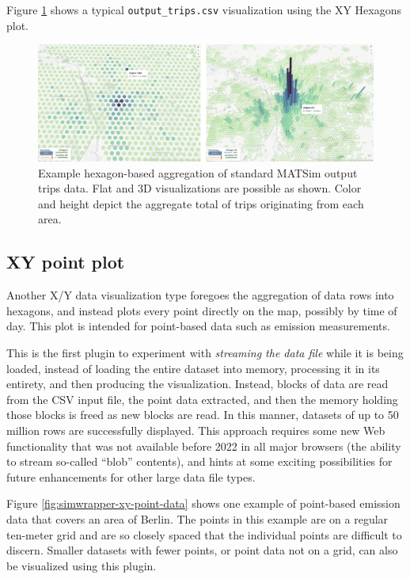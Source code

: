 Figure \ref{fig:simwrapper-xy-hexagons} shows a typical \texttt{output\_trips.csv} visualization using the XY Hexagons plot.

\begin{figure}[ht]
  \centering
  \includegraphics[width=0.95\linewidth]{chapters/31-simwrapper/images/xy-hexagons.jpg}
  \caption{Example hexagon-based aggregation of standard MATSim output trips data. Flat and 3D visualizations are possible as shown. Color and height depict the aggregate total of trips originating from each area. }
  \label{fig:simwrapper-xy-hexagons}
\end{figure}

\hypertarget{simwrapper-xyt-plots}{%
\subsection{XY point plot}\label{simwrapper-xy-point-plots}}

Another X/Y data visualization type foregoes the aggregation of data rows into hexagons, and instead plots every point directly on the map, possibly by time of day. This plot is intended for point-based data such as emission measurements.

This is the first plugin to experiment with \emph{streaming the data file} while it is being loaded, instead of loading the entire dataset into memory, processing it in its entirety, and then producing the visualization. Instead, blocks of data are read from the CSV input file, the point data extracted, and then the memory holding those blocks is freed as new blocks are read. In this manner, datasets of up to 50 million rows are successfully displayed. This approach requires some new Web functionality that was not available before 2022 in all major browsers (the ability to stream so-called ``blob'' contents), and hints at some exciting possibilities for future enhancements for other large data file types.

Figure \ref{fig:simwrapper-xy-point-data} shows one example of point-based emission data that covers an area of Berlin. The points in this example are on a regular ten-meter grid and are so closely spaced that the individual points are difficult to discern. Smaller datasets with fewer points, or point data not on a grid, can also be visualized using this plugin.

